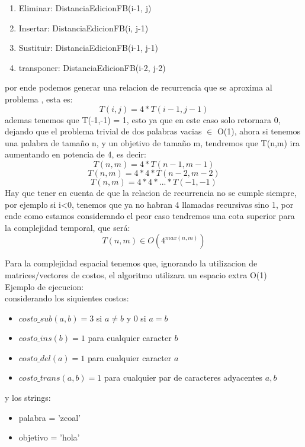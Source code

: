 \begin{enumerate}[1]
    \item Eliminar:  DistanciaEdicionFB(i-1, j)
    \item Insertar:  DistanciaEdicionFB(i, j-1)
    \item Sustituir: DistanciaEdicionFB(i-1, j-1)
    \item transponer: DistanciaEdicionFB(i-2, j-2)
\end{enumerate}

por ende podemos generar una relacion de recurrencia que se aproxima al problema , esta es:
\[
    T(i,j) = 4*T(i-1,j-1)
\]
ademas tenemos que T(-1,-1) = 1, esto ya que en este caso solo retornara 0, dejando que el problema trivial de dos palabras vacias $\in $ O(1), ahora si tenemos una palabra de tamaño n, y un objetivo de tamaño m, tendremos que T(n,m) ira aumentando en potencia de 4, es decir:
\[
    T(n,m) = 4*T(n-1,m-1)
\]
\[
    T(n,m) = 4*4*T(n-2,m-2)
\]
\[
    T(n,m) = 4*4*...*T(-1,-1)
\]
Hay que tener en cuenta de que la relacion de recurrencia no se cumple siempre, por ejemplo si i<0, tenemos que ya no habran 4 llamadas recursivas sino 1, por ende como estamos considerando el peor caso tendremos una cota superior para la complejidad temporal, que será:
\[
    T(n,m) \in  O(4^{max(n,m)})
\]

Para la complejidad espacial tenemos que, ignorando la utilizacion de matrices/vectores de costos, el algoritmo utilizara un espacio extra O(1)\\

Ejemplo de ejecucion:\\
considerando los siquientes costos:
\begin{itemize}
    \item $costo\_sub(a,b) = 3$ si $a \neq b$ y $0$ si $a = b$
    \item $costo\_ins(b) = 1$ para cualquier caracter $b$
    \item $costo\_del(a) = 1$ para cualquier caracter $a$
    \item $costo\_trans(a,b) = 1$ para cualquier par de caracteres adyacentes $a, b$
\end{itemize}
y los strings:
\begin{itemize}
    \item palabra = 'zcoal'
    \item objetivo = 'hola'
\end{itemize}

